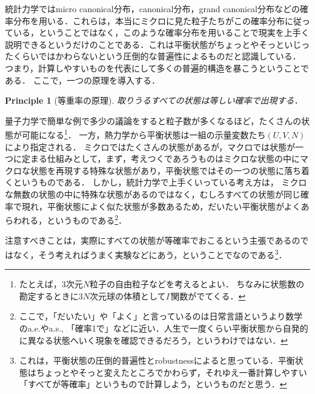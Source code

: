 \documentclass[dvipdfmx, a4paper]{jsarticle}
\theoremstyle{break}
\newtheorem{fact}[thm]{Fact}
\newtheorem{ppl}[thm]{Principle}
\numberwithin{equation}{section}
\begin{document}
	統計力学ではmicro canonical分布，canonical分布，grand canonical分布などの確率分布を用いる．これらは，本当にミクロに見た粒子たちがこの確率分布に従っている，ということではなく，このような確率分布を用いることで現実を上手く説明できるというだけのことである．これは平衡状態がちょっとやそっといじったくらいではかわらないという圧倒的な普遍性によるものだと認識している．
	つまり，計算しやすいものを代表にして多くの普遍的構造を暴こうということである．
	ここで，一つの原理を導入する．
	\begin{ppl}[等重率の原理]\label{ppl:equal}
			取りうるすべての状態は等しい確率で出現する．
	\end{ppl}
	量子力学で簡単な例で多少の議論をすると粒子数が多くなるほど，たくさんの状態が可能になる\footnote{たとえば，3次元$N$粒子の自由粒子などを考えるとよい．
	ちなみに状態数の勘定するときに$3N$次元球の体積として$\Gamma$関数がでてくる．}．
	一方，熱力学から平衡状態は一組の示量変数たち$(U, V, N)$により指定される．
	ミクロではたくさんの状態があるが，マクロでは状態が一つに定まる仕組みとして，まず，考えつくであろうものはミクロな状態の中にマクロな状態を再現する特殊な状態があり，平衡状態ではその一つの状態に落ち着くというものである．
	しかし，統計力学で上手くいっている考え方は，
	ミクロな無数の状態の中に特殊な状態があるのではなく，むしろすべての状態が同じ確率で現れ，平衡状態によく似た状態が多数あるため，だいたい平衡状態がよくあらわれる，というものである\footnote{ここで，「だいたい」や「よく」と言っているのは日常言語というより数学のa.e.やa.s., 「確率1で」などに近い．人生で一度くらい平衡状態から自発的に異なる状態へいく現象を確認できるだろう，というわけではない．}．

	注意すべきことは，実際にすべての状態が等確率でおこるという主張であるのではなく，そう考えればうまく実験などにあう，ということでなのである\footnote{これは，平衡状態の圧倒的普遍性とrobustnessによると思っている．平衡状態はちょっとやそっと変えたところでかわらず，それゆえ一番計算しやすい「すべてが等確率」というもので計算しよう，というものだと思う．}．

\end{document}
